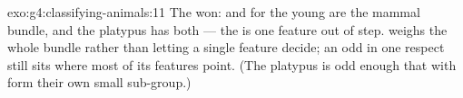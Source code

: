 \begin{solution}{exo:g4:classifying-animals:11}
The  won:  and  for the young are the mammal
bundle, and the platypus has both --- the  is one feature
out of step.  weighs the whole bundle rather than
letting a single feature decide; an  odd in one respect
still sits where most of its features point. (The platypus is
odd enough that  with  form their own small
sub-group.)
\end{solution}
